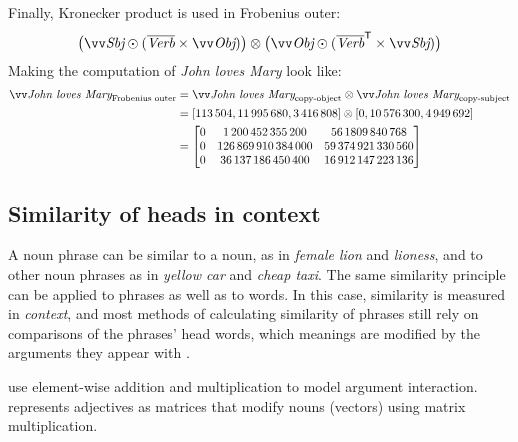Finally, Kronecker product is used in Frobenius outer:%
\begin{equation*}
  \big(\ov{\text{\it Sbj}} \odot (\overline{\text{\it Verb}} \times \ov{\text{\it Obj}})\big) \otimes %
  \big(\ov{\text{\it Obj}} \odot (\overline{\text{\it Verb}}^{\mathsf{T}} \times \ov{\text{\it Sbj}})\big)
\end{equation*}
%
Making the computation of \textit{John loves Mary} look like:
\begin{align*}
  \ov{\text{\it John loves Mary}}_{\text{Frobenius outer}} &=  \ov{\text{\it John loves Mary}}_{\text{copy-object}} \otimes \ov{\text{\it John loves Mary}}_{\text{copy-subject}}\\
                                                         &= [113\,504, 11\,995\,680,  3\,416\,808] \otimes [0, 10\,576\,300,  4\,949\,692] \\
                                                           &=%
                                                             \begin{bmatrix}
0 &   1\,200\,452\,355\,200 &      56\,1809\,840\,768 \\
0 & 126\,869\,910\,384\,000 &  59\,374\,921\,330\,560 \\
0 &  36\,137\,186\,450\,400 &  16\,912\,147\,223\,136 \\
                                                             \end{bmatrix}
\end{align*}


\subsection{Similarity of heads in context}
\label{sec:similarity-context}

A noun phrase can be similar to a noun, as in \textit{female lion} and \textit{lioness}, and to other noun phrases as in \textit{yellow car} and \textit{cheap taxi}. The same similarity principle can be applied to phrases as well as to words. In this case, similarity is measured in \emph{context}, and most methods of calculating similarity of phrases still rely on comparisons of the phrases' head words, which meanings are modified by the arguments they appear with \cite{Kintsch2001173}.

 use element-wise addition and multiplication to model argument interaction.  represents adjectives as matrices that modify nouns (vectors) using matrix multiplication.

